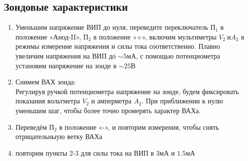 \documentclass[11pt,a4paper]{article}
\begin{document}
\subsection*{Зондовые характеристики}
\begin{enumerate}
  \item Уменьшим напряжение ВИП до нуля, переведите переключатель $П_1$
  в положение «Анод-II», $П_2$ в положение «+», 
  включим мультиметры  $V_2\ и A_2$ в режимы 
  измерение напряжения и силы тока соответственно. Плавно увеличим 
  напряжения на ВИП до $\sim5мА$, с помощью потенциометра
  установим напряжение на зонде в $\sim25В$
  \item Снимем ВАХ зонда:\\
  Регулируя ручкой потенциометра напряжение на зонде,
  будем фиксировать показания вольтметра $V_2$ и амперметра $A_2$.
  При приближении к нулю уменьшим шаг, чтобы более точно
  промерять характер ВАХа.
  \item Переведём  $П_2$ в положение «-», и повторим измерения, 
  чтобы снять отрицательныую ветку ВАХа
  \item повторим пункты 2-3 для силы тока на ВИП в $3мА$ и $1.5мА$
\end{enumerate}
\end{document}
